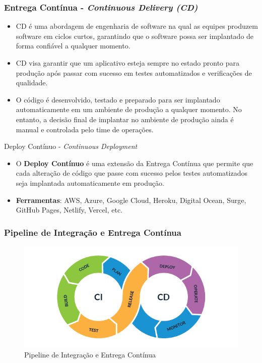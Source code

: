 \documentclass[
	9pt, %
	t, %
]{beamer}
\newcommand{\yellowbox}[1]{\colorbox{yellow!75}{#1}}
\begin{document}
\begin{frame}
	\frametitle{Entrega Contínua - \textit{Continuous Delivery (CD)}}
	\begin{itemize}
		\item CD é uma abordagem de engenharia de software na qual as equipes produzem software em \yellowbox{ciclos curtos}, garantindo que o software possa ser implantado de forma confiável a \yellowbox{qualquer momento}.
		\item CD visa garantir que um aplicativo esteja sempre no estado pronto para produção após passar com sucesso em testes automatizados e verificações de qualidade.
		\item O código é desenvolvido, testado e preparado para ser implantado automaticamente em um ambiente de produção a qualquer momento. No entanto, a decisão final de implantar no ambiente de produção ainda é manual e controlada pelo time de operações.
	\end{itemize}

	\begin{block}{Deploy Contínuo - \textit{Continuous Deployment}}
		\begin{itemize}
			\item O \textbf{Deploy Contínuo} é uma extensão da Entrega Contínua que permite que cada alteração de código que passe com sucesso pelos testes automatizados seja implantada automaticamente em produção.
			\item \textbf{Ferramentas}: AWS, Azure, Google Cloud, Heroku, Digital Ocean, Surge, GitHub Pages, Netlify, Vercel, etc.
		\end{itemize}
	\end{block}

\end{frame}


\begin{frame}
	\frametitle{Pipeline de Integração e Entrega Contínua}
	\begin{figure}
		\centering
		\includegraphics[width=0.9\linewidth]{ci_cd_pipeline.png}
		\caption{Pipeline de Integração e Entrega Contínua}
		\label{fig:ci_cd}
	\end{figure}
\end{frame}
\end{document}
